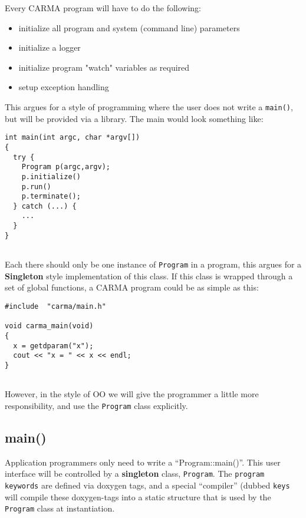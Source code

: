 \documentclass[preprint]{aastex} %
\begin{document}
Every CARMA program will have to do the following:

\begin{itemize}


\item 
initialize all program and system (command line) parameters

\item 
initialize a logger

\item
initialize program "watch" variables as required

\item
setup exception handling

\end{itemize}

This argues for a style of programming where the user does not write
a {\tt main()}, but will be provided via a library. The main would
look something like:

\footnotesize\begin{verbatim}
int main(int argc, char *argv[]) 
{
  try {
    Program p(argc,argv);
    p.initialize()
    p.run()
    p.terminate();
  } catch (...) {
    ...
  }
}
  
\end{verbatim}\normalsize
Each there should only be one instance of {\tt Program} in a program,
this argues for a {\bf Singleton} style implementation of this class.
If this class is wrapped through a set of global functions, a CARMA
program could be as simple as this:

\footnotesize\begin{verbatim}
#include  "carma/main.h"

void carma_main(void)
{
  x = getdparam("x");
  cout << "x = " << x << endl;
}
  
\end{verbatim}\normalsize

However, in the style of OO we will give the programmer a little more 
responsibility, and use the {\tt Program} class explicitly.

\subsection{main()}

Application programmers only need to write a ``Program::main()''.
This user interface will be controlled by a 
{\bf singleton} class, {\tt Program}. The
{\tt program keywords} are defined via doxygen tags,
and a special ``compiler'' (dubbed {\tt keys} will
compile these doxygen-tags into a static structure
that is used by the {\tt Program} class at 
instantiation. 
\end{document}
